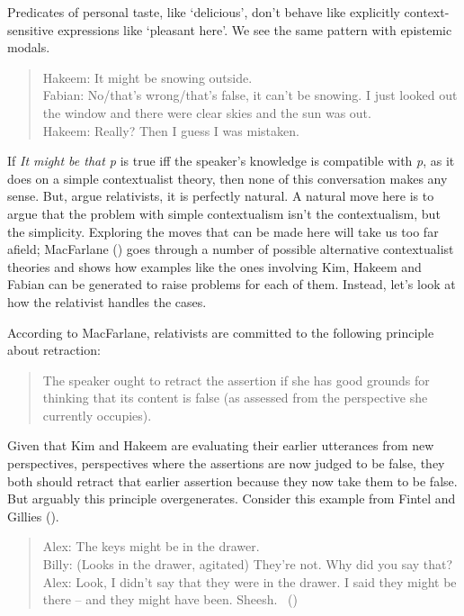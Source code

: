 \documentclass[
  11pt,
  letterpaper,
  DIV=11,
  numbers=noendperiod,
  twoside]{scrartcl}
\begin{document}
Predicates of personal taste, like `delicious', don't behave like
explicitly context-sensitive expressions like `pleasant here'. We see
the same pattern with epistemic modals.

\begin{quote}
Hakeem: It might be snowing outside.\\
Fabian: No/that's wrong/that's false, it can't be snowing. I just looked
out the window and there were clear skies and the sun was out.\\
Hakeem: Really? Then I guess I was mistaken.
\end{quote}

If \emph{It might be that p} is true iff the speaker's knowledge is
compatible with \emph{p}, as it does on a simple contextualist theory,
then none of this conversation makes any sense. But, argue relativists,
it is perfectly natural. A natural move here is to argue that the
problem with simple contextualism isn't the contextualism, but the
simplicity. Exploring the moves that can be made here will take us too
far afield; MacFarlane () goes
through a number of possible alternative contextualist theories and
shows how examples like the ones involving Kim, Hakeem and Fabian can be
generated to raise problems for each of them. Instead, let's look at how
the relativist handles the cases.

According to MacFarlane, relativists are committed to the following
principle about retraction:

\begin{quote}
The speaker ought to retract the assertion if she has good grounds for
thinking that its content is false (as assessed from the perspective she
currently occupies).
\end{quote}

Given that Kim and Hakeem are evaluating their earlier utterances from
new perspectives, perspectives where the assertions are now judged to be
false, they both should retract that earlier assertion because they now
take them to be false. But arguably this principle overgenerates.
Consider this example from Fintel and Gillies
().

\begin{quote}
Alex: The keys might be in the drawer.\\
Billy: (Looks in the drawer, agitated) They're not. Why did you say
that?\\
Alex: Look, I didn't say that they were in the drawer. I said they might
be there -- and they might have been. Sheesh.
~()
\end{quote}
\end{document}
